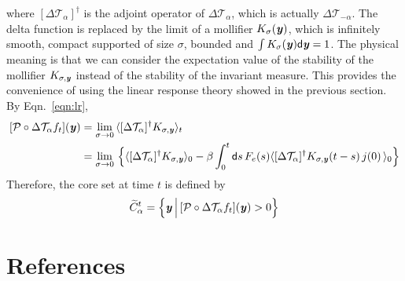 \documentclass[aip,jcp,a4paper,reprint,onecolumn]{revtex4-1}
\newcommand{\vect}[1]{\textbf{\textit{#1}}}
\newcommand{\dd}{\textsf{d}}
\newcommand{\mt}{\mathcal T}
\begin{document}
where $[\Delta \mt_\alpha]^\dagger$ is the adjoint operator of $\Delta
\mt_\alpha$, which is actually $\Delta \mt_{-\alpha}$. The delta
function is replaced by the limit of a mollifier $K_\sigma(\vect y)$,
which is infinitely smooth, compact supported of size $\sigma$,
bounded and $\int
K_\sigma(\vect y)\dd \vect y = 1$.  The physical meaning is that we
can consider the expectation value of the stability of the mollifier
$K_{\sigma, \vect y}$ instead of the stability of the invariant measure.
This provides the convenience of using the linear response theory showed
in the previous section. By Eqn.~\eqref{eqn:lr},
\begin{align}\nonumber
  [\mathcal P\circ\Delta \mt_\alpha f_t](\vect y)
  &=
  \lim_{\sigma \rightarrow 0}\,
  \langle
  [\Delta \mt_\alpha]^\dagger K_{\sigma, \vect y}
  \rangle_t \\
  &=
  \lim_{\sigma \rightarrow 0}\,
  \Big\{
  \langle
  [\Delta \mt_\alpha]^\dagger K_{\sigma, \vect y}
  \rangle_0  -
  \beta
  \int_0^t\dd s\,
  F_e(s)
  \langle
  [\Delta \mt_\alpha]^\dagger K_{\sigma, \vect y}(t-s)\,
  j(0)\,
  \rangle_0
  \Big\}
\end{align}
Therefore, the core set at time $t$ is defined by
\begin{align}
  \widetilde C_\alpha^t =
  \Big\{
  \vect y
  \,\Big\vert\,
  [\mathcal P\circ\Delta \mt_\alpha f_t](\vect y) > 0
  \Big\}
\end{align}


\section*{References}
{}

\end{document}
